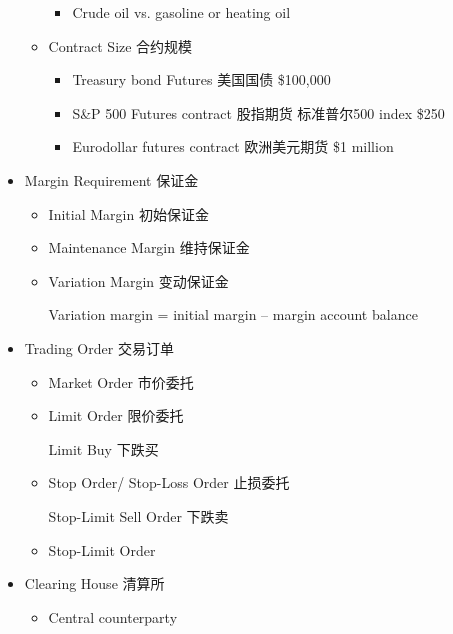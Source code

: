 \documentclass[a4paper,6pt,twoside,openany]{article}
\begin{document}
\begin{itemize}
\begin{itemize}
\begin{itemize}
    \item Crude oil vs. gasoline or heating oil
    \end{itemize}
  \item Contract Size 合约规模
    \begin{itemize}
    \item Treasury bond Futures 美国国债 \$100,000
    \item S\&P 500 Futures contract 股指期货 标准普尔500 index \$250
    \item Eurodollar futures contract 欧洲美元期货 \$1 million
    \end{itemize}
  \end{itemize}
\item Margin Requirement 保证金
  \begin{itemize}
  \item Initial Margin 初始保证金
  \item Maintenance Margin 维持保证金
  \item Variation Margin 变动保证金
    \par Variation margin = initial margin – margin account balance
  \end{itemize}
    
\item Trading Order 交易订单
  \begin{itemize}
  \item Market Order 市价委托
  \item Limit Order 限价委托
    \par Limit Buy 下跌买
  \item Stop Order/ Stop-Loss Order 止损委托
    \par Stop-Limit Sell Order 下跌卖
  \item Stop-Limit Order
  \end{itemize}
    
\item Clearing House 清算所
  \begin{itemize}
  \item Central counterparty
  \end{itemize}
\end{itemize}
\end{document}
